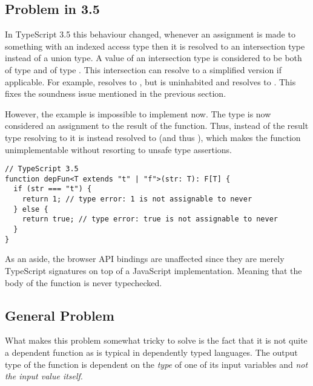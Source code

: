 % 

\subsection{Problem in 3.5}

In TypeScript 3.5 this behaviour changed, whenever an assignment is made to something with an indexed access type then it is resolved to an intersection type instead of a union type. A value of an intersection type  is considered to be both of type  and of type . This intersection can resolve to a simplified version if applicable. For example,  resolves to , but  is uninhabited and resolves to . This fixes the soundness issue mentioned in the previous section.

However, the  example is impossible to implement now. The type  is now considered an assignment to the result of the function. Thus, instead of the result type resolving to  it is instead resolved to  (and thus ), which makes the function unimplementable without resorting to unsafe type assertions.

\begin{lstlisting}
// TypeScript 3.5
function depFun<T extends "t" | "f">(str: T): F[T] {
  if (str === "t") {
    return 1; // type error: 1 is not assignable to never
  } else {
    return true; // type error: true is not assignable to never
  }
}
\end{lstlisting}

As an aside, the browser API bindings are unaffected since they are merely TypeScript signatures on top of a JavaScript implementation. Meaning that the body of the function is never typechecked.

\subsection{General Problem}

What makes this problem somewhat tricky to solve is the fact that it is not quite a dependent function as is typical in dependently typed languages. The output type of the function is dependent on the \emph{type} of one of its input variables and \emph{not the input value itself}.

